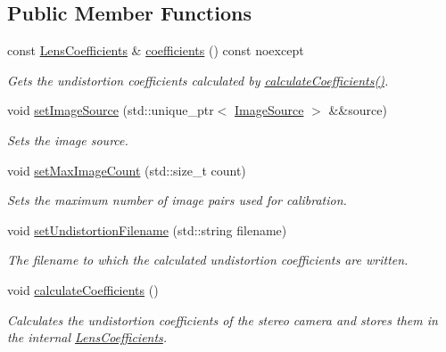 \subsection*{Public Member Functions}
\begin{DoxyCompactItemize}
\item 
const \hyperlink{structstereo__ugv_1_1LensCoefficients}{Lens\+Coefficients} \& \hyperlink{classstereo__ugv_1_1LensCalibrator_a570522d1aa54e4ec153b47f6b86063e2}{coefficients} () const noexcept
\begin{DoxyCompactList}\small\item\em Gets the undistortion coefficients calculated by \hyperlink{classstereo__ugv_1_1LensCalibrator_aeeb532144b29ae7004ee14e2695def97}{calculate\+Coefficients()}. \end{DoxyCompactList}\item 
void \hyperlink{classstereo__ugv_1_1LensCalibrator_a13c279f4c0a4cc7b815340e31d5447be}{set\+Image\+Source} (std\+::unique\+\_\+ptr$<$ \hyperlink{classstereo__ugv_1_1ImageSource}{Image\+Source} $>$ \&\&source)
\begin{DoxyCompactList}\small\item\em Sets the image source. \end{DoxyCompactList}\item 
void \hyperlink{classstereo__ugv_1_1LensCalibrator_a8171c3a541429bd25ed64eb5140bbf2c}{set\+Max\+Image\+Count} (std\+::size\+\_\+t count)
\begin{DoxyCompactList}\small\item\em Sets the maximum number of image pairs used for calibration. \end{DoxyCompactList}\item 
void \hyperlink{classstereo__ugv_1_1LensCalibrator_a4debdb4b31e7b474576269cc15da15d7}{set\+Undistortion\+Filename} (std\+::string filename)
\begin{DoxyCompactList}\small\item\em The filename to which the calculated undistortion coefficients are written. \end{DoxyCompactList}\item 
\mbox{\label{classstereo__ugv_1_1LensCalibrator_aeeb532144b29ae7004ee14e2695def97}} 
void \hyperlink{classstereo__ugv_1_1LensCalibrator_aeeb532144b29ae7004ee14e2695def97}{calculate\+Coefficients} ()
\begin{DoxyCompactList}\small\item\em Calculates the undistortion coefficients of the stereo camera and stores them in the internal \hyperlink{structstereo__ugv_1_1LensCoefficients}{Lens\+Coefficients}. \end{DoxyCompactList}\item 

\end{DoxyCompactItemize}
